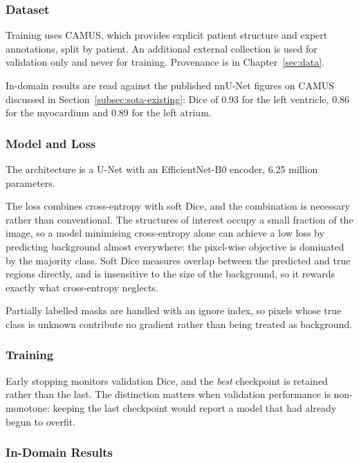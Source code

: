\subsubsection{Dataset}

Training uses CAMUS, which provides explicit patient structure and expert annotations, split by
patient. An additional external collection is used for validation only and never for training.
Provenance is in Chapter~\ref{sec:data}.

In-domain results are read against the published nnU-Net figures on CAMUS discussed in
Section~\ref{subsec:sota-existing}: Dice of 0.93 for the left ventricle, 0.86 for the myocardium
and 0.89 for the left atrium.

\subsubsection{Model and Loss}

The architecture is a U-Net with an EfficientNet-B0 encoder, 6.25 million parameters.

The loss combines cross-entropy with soft Dice, and the combination is necessary rather than
conventional. The structures of interest occupy a small fraction of the image, so a model
minimising cross-entropy alone can achieve a low loss by predicting background almost
everywhere: the pixel-wise objective is dominated by the majority class. Soft Dice measures
overlap between the predicted and true regions directly, and is insensitive to the size of the
background, so it rewards exactly what cross-entropy neglects.

Partially labelled masks are handled with an ignore index, so pixels whose true class is
unknown contribute no gradient rather than being treated as background.

\subsubsection{Training}

Early stopping monitors validation Dice, and the \emph{best} checkpoint is retained rather than
the last. The distinction matters when validation performance is non-monotone: keeping the last
checkpoint would report a model that had already begun to overfit.

\subsubsection{In-Domain Results}
\label{subsec:cardiac-results}

